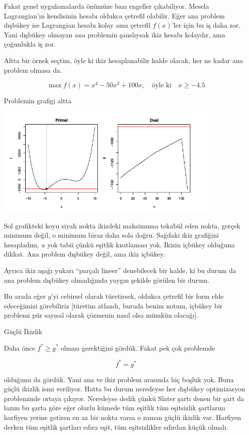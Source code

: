 \documentclass[12pt,fleqn]{article}\usepackage{../../common}
\begin{document}
Fakat genel uygulamalarda önümüze bazı engeller çıkabiliyor. Mesela
Lagrangian'ın kendisinin hesabı oldukca çetrefil olabilir. Eğer ana problem
dışbükey ise Lagrangian hesabı kolay ama çetrefil $f(x)$'ler için bu iş
daha zor. Yani dışbükey olmayan ana problemin şanslıysak ikiz hesabı
kolaydır, ama çoğunlukla iş zor. 

Altta bir örnek seçtim, öyle ki ikiz hesaplanabilir halde olacak, her ne
kadar ana problem olmasa da. 

$$
\max f(x) = x^4 - 50x^2 + 100x, \quad \textrm{öyle ki} \quad x \ge -4.5
$$

Problemin grafigi altta

\includegraphics[width=30em]{func_56_gendual_04.png}

Sol grafikteki koyu siyah nokta ikizdeki maksimuma tekabül eden nokta,
gerçek minimum değil, o minimum biraz daha sola doğru. Sağdaki ikiz
grafiğini hesapladım, $u$ yok tabii çünkü eşitlik kısıtlaması yok. İkizin
içbükey olduğuna dikkat. Ana problem dışbükey değil, ama ikiz içbükey. 

Ayrıca ikiz aşağı yukarı ``parçalı lineer'' denebilecek bir halde, ki bu
durum da ana problem dışbükey olmadığında yaygın şekilde görülen bir durum.

Bu arada eğer $g$'yi cebirsel olarak türetirsek, oldukca çetrefil bir form
elde edeceğimizi görebiliriz [türetim atlandı, burada benim notum, içbükey
bir problemi pür sayısal olarak çözmenin nasıl olsa mümkün olacağı].

Güçlü İkizlik 

Daha önce $f^* \ge g^*$ olması gerektiğini gördük. Fakat pek çok problemde 

$$
f^* = g^*
$$

olduğunu da gördük. Yani ana ve ikiz problem arasında hiç boşluk yok. Buna
güçlü ikizlik ismi veriliyor. Hatta bu durum neredeyse her dışbükey
optimizasyon probleminde ortaya çıkıyor. Neredeyse dedik çünkü Slater şartı
denen bir şart da lazım bu şarta göre eğer olurlu kümede tüm eşitlik tüm
eşitsizlik şartlarını harfiyen yerine getiren en az bir nokta varsa o zaman
güçlü ikizlik var. Harfiyen derken tüm eşitlik şartları sıfıra eşit, tüm
eşitsizlikler sıfırdan küçük olmalı.
\end{document}
